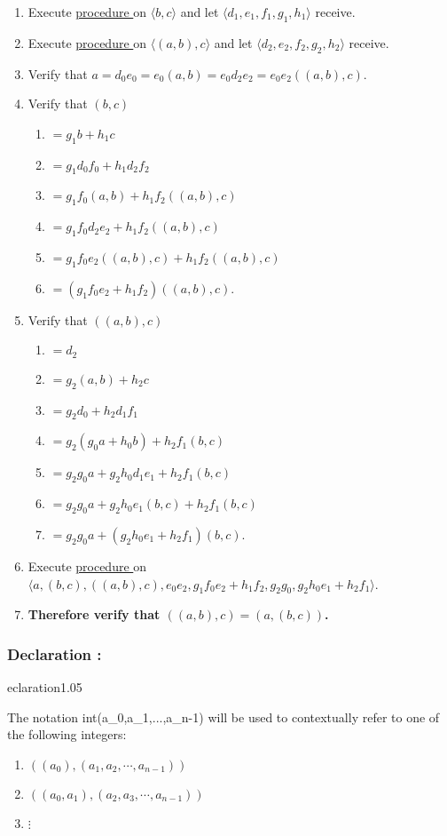\documentclass{article}
\newcounter{declaration}[part]
\newcommand{\declaration}[1]{\subsubsection*{Declaration \thepart:\thedeclaration}\label{sec:declaration #1}\global\expandafter\edef\csname declaration#1\endcsname{\thepart:\thedeclaration}\addtocounter{declaration}{1}}
\newcounter{procedure}[part]
\newcommand{\procedurehr}[1]{\hyperref[sec:procedure #1]{procedure \expandafter\csname procedure#1\endcsname}}
\begin{document}
\begin{multicols}{2}
\begin{enumerate}
					\item Execute \procedurehr{1.09} on $\langle b,c\rangle$ and let $\langle d_1,e_1,f_1,g_1,h_1\rangle$ receive.
					\item Execute \procedurehr{1.09} on $\langle (a,b),c\rangle$ and let $\langle d_2,e_2,f_2,g_2,h_2\rangle$ receive.
					\item Verify that $a=d_0e_0=e_0(a,b)=e_0d_2e_2=e_0e_2((a,b),c)$.
					\item Verify that $(b,c)$
					\begin{enumerate}
						\item $=g_1b+h_1c$
						\item $=g_1d_0f_0+h_1d_2f_2$
						\item $=g_1f_0(a,b)+h_1f_2((a,b),c)$
						\item $=g_1f_0d_2e_2+h_1f_2((a,b),c)$
						\item $=g_1f_0e_2((a,b),c)+h_1f_2((a,b),c)$
						\item $=(g_1f_0e_2+h_1f_2)((a,b),c)$.
					\end{enumerate}
					\item Verify that $((a,b),c)$
					\begin{enumerate}
						\item $=d_2$
						\item $=g_2(a,b)+h_2c$
						\item $=g_2d_0+h_2d_1f_1$
						\item $=g_2(g_0a+h_0b)+h_2f_1(b,c)$
						\item $=g_2g_0a+g_2h_0d_1e_1+h_2f_1(b,c)$
						\item $=g_2g_0a+g_2h_0e_1(b,c)+h_2f_1(b,c)$
						\item $=g_2g_0a+(g_2h_0e_1+h_2f_1)(b,c)$.
					\end{enumerate}
					\item Execute \procedurehr{1.14} on $\langle a,(b,c),((a,b),c),e_0e_2,g_1f_0e_2+h_1f_2,g_2g_0,g_2h_0e_1+h_2f_1\rangle$.
					\item \textbf{Therefore verify that $((a,b),c)=(a,(b,c))$.}
				\end{enumerate}
		\declaration{1.05}
			The notation \gls{int(a_0,a_1,...,a_n-1)} will be used to contextually refer to one of the following integers:
			\begin{enumerate}
				\item $((a_0),(a_1,a_2,\cdots,a_{n-1}))$
				\item $((a_0,a_1),(a_2,a_3,\cdots,a_{n-1}))$
				\item $\vdots$

\end{enumerate}
\end{multicols}
\end{document}
